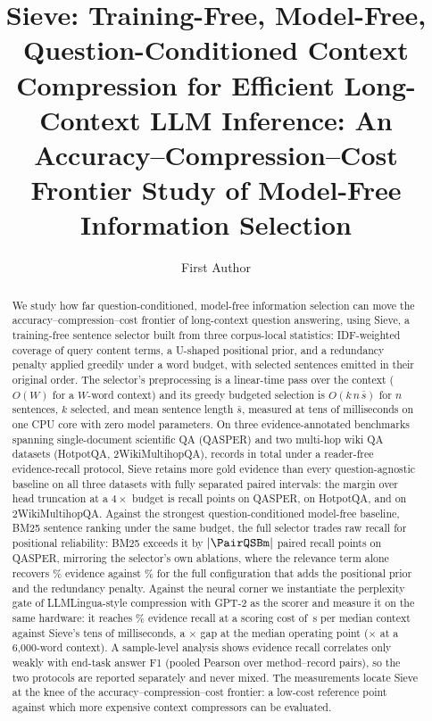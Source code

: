 \documentclass[preprint,12pt]{elsarticle}
\author{First Author\corref{cor1}}
\DeclarePairedDelimiter\abs{\lvert}{\rvert}
\theoremstyle{remark}
\newcommand{\method}{Sieve}
\begin{document}
\begin{frontmatter}

\title{Sieve: Training-Free, Model-Free, Question-Conditioned Context
Compression for Efficient Long-Context LLM Inference: An
Accuracy--Compression--Cost Frontier Study of Model-Free Information
Selection}

\begin{abstract}
We study how far question-conditioned, model-free information selection
can move the accuracy--compression--cost frontier of long-context
question answering, using \method{}, a training-free sentence selector
built from three corpus-local statistics: IDF-weighted coverage of
query content terms, a U-shaped positional prior, and a redundancy
penalty applied greedily under a word budget, with selected sentences
emitted in their original order. The selector's preprocessing is a
linear-time pass over the context ($O(W)$ for a $W$-word context) and
its greedy budgeted selection is $O(k\,n\,\bar{s})$ for $n$ sentences,
$k$ selected, and mean sentence length $\bar{s}$, measured at tens of
milliseconds on one CPU core with zero model parameters. On three
evidence-annotated benchmarks spanning single-document scientific QA
(QASPER) and two multi-hop wiki QA datasets (HotpotQA,
2WikiMultihopQA), \TotalRecords{} records in total under a reader-free
evidence-recall protocol, \method{} retains more gold evidence than
every question-agnostic baseline on all three datasets with fully
separated paired intervals: the margin over head truncation at a
$4\times$ budget is \PairQSH{} recall points on QASPER, \PairHSH{} on
HotpotQA, and \PairWSH{} on 2WikiMultihopQA. Against the strongest
question-conditioned model-free baseline, BM25 sentence ranking under
the same budget, the full selector trades raw recall for positional
reliability: BM25 exceeds it by $\abs{\PairQSBm}$ paired recall
points on QASPER, mirroring the selector's own ablations, where the
relevance term alone recovers \AblRelOnly\% evidence against
\AblSie\% for the full configuration that adds the positional prior
and the redundancy penalty. Against the neural corner we instantiate
the perplexity gate of LLMLingua-style compression with GPT-2 as the
scorer and measure it on the same hardware: it reaches
\GateRecall\% evidence recall at a scoring cost of
\GateLatMedCtxS\,s per median context against \method{}'s tens of
milliseconds, a \GateSieRatioMed$\times$ gap at the median operating
point (\GateSieRatioSixk$\times$ at a 6{,}000-word context). A
sample-level analysis shows evidence recall correlates only weakly
with end-task answer F1 (pooled Pearson \CorrPearson{} over
\CorrNPairs{} method--record pairs), so the two protocols are reported
separately and never mixed. The measurements locate \method{} at the
knee of the accuracy--compression--cost frontier: a low-cost reference
point against which more expensive context compressors can be
evaluated.
\end{abstract}


\end{frontmatter}
\end{document}
